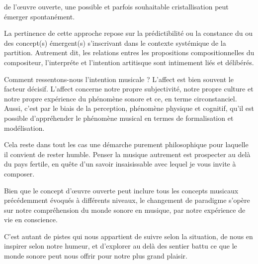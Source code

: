 \documentclass{article}
\begin{document}
de l’œuvre ouverte, une possible et parfois souhaitable cristallisation peut émerger spontanément.

La pertinence de cette approche repose sur la prédictibilité ou la constance du ou des concept(s) émergent(s) s’inscrivant dans le contexte systémique de la partition. Autrement dit, les relations entres les propositions compositionnelles du compositeur, l’interpréte et l’intention artitisque sont intimement liés et délibérés.

Comment ressentons-nous l’intention musicale ? L’affect est bien souvent le facteur décisif. L’affect concerne notre propre subjectivité, notre propre culture et notre propre expérience du phénomène sonore et ce, en terme circonstanciel. Aussi, c’est par le biais de la perception, phénomène physique et cognitif, qu’il est possible d’appréhender le phénomène musical en termes de formalisation et modélisation.

Cela reste dans tout les cas une démarche purement philosophique pour laquelle il convient de rester humble. Penser la musique autrement est prospecter au delà du pays fertile, en quête d’un savoir insaisissable avec lequel je vous invite à composer.

Bien que le concept d'œuvre ouverte peut inclure tous les concepts musicaux précédemment évoqués à différents niveaux, le changement de paradigme s'opère sur notre compréhension du monde sonore en musique, par notre expérience de vie en conscience.

\bigskip

C’est autant de pistes qui nous appartient de suivre selon la situation, de nous en inspirer selon notre humeur, et d’explorer au delà des sentier battu ce que le monde sonore peut nous offrir pour notre plus grand plaisir. 
\end{document}
